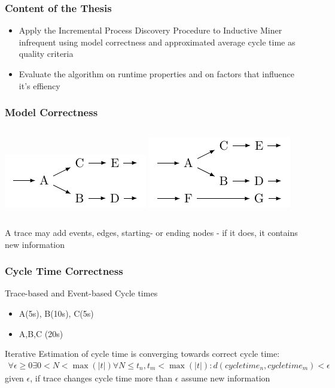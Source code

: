 \documentclass{beamer}
\begin{document}
\begin{frame}
\frametitle{Content of the Thesis}
\begin{itemize}
\item Apply the Incremental Process Discovery Procedure to Inductive Miner infrequent using model correctness and approximated average cycle time as quality criteria
\item Evaluate the algorithm on runtime properties and on factors that influence it's effiency
\end{itemize}
\end{frame}

\begin{frame}
\frametitle{Model Correctness}
\begin{columns}
\includegraphics[width=0.8\linewidth]{img/dfgraph_before_trace.pdf}
\includegraphics[width=0.8\linewidth]{img/dfgraph_added_trace.pdf}
\end{columns}\vspace{1cm}
A trace may add events, edges, starting- or ending nodes - if it does, it contains new information
\end{frame}

\begin{frame}
\frametitle{Cycle Time Correctness}
Trace-based and Event-based Cycle times
\begin{itemize}
\item A(5s), B(10s), C(5s)
\item A,B,C (20s)
\end{itemize}
\vspace{1cm}
Iterative Estimation of cycle time is converging towards correct cycle time:
\begin{align*}
\forall \epsilon\geq0 \exists 0<N<\max(|t|) \forall N\leq t_n,t_m <\max(|t|): d(cycle time_n, cycle time_m)<\epsilon
\end{align*}
given $\epsilon$, if trace changes cycle time more than $\epsilon$ assume new information
\end{frame}
\end{document}
